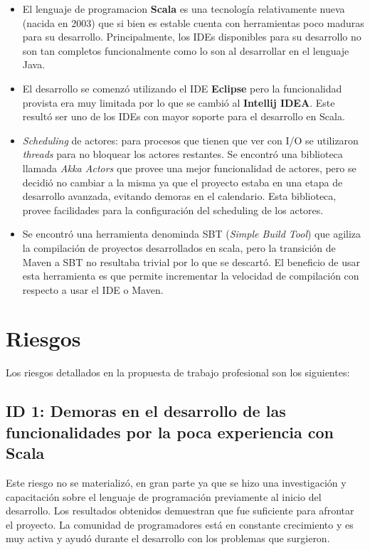 \documentclass[12pt,a4paper]{article}
\begin{document}
\begin{itemize}
	\item El lenguaje de programacion \textbf{Scala} es una tecnología relativamente nueva (nacida en 2003) que
	si bien es estable cuenta con herramientas poco maduras para su desarrollo. Principalmente, los IDEs disponibles
	para su desarrollo no son tan completos funcionalmente como lo son al desarrollar en el lenguaje Java.

	\item El desarrollo se comenzó utilizando el IDE \textbf{Eclipse} pero la funcionalidad provista era muy
	limitada por lo que se cambió al \textbf{Intellij IDEA}. Este resultó ser uno de los IDEs con mayor soporte
	para el desarrollo en Scala.

	\item \textit{Scheduling} de actores: para procesos que tienen que ver con I/O se utilizaron \textit{threads}
	para no bloquear los actores restantes. Se encontró una biblioteca llamada \textit{Akka Actors} que 
	provee una mejor funcionalidad de actores, pero se decidió no cambiar a la misma ya que el proyecto estaba
	en una etapa de desarrollo avanzada, evitando demoras en el calendario. Esta biblioteca, provee facilidades
	para la configuración del scheduling de los actores.

    \item Se encontró una herramienta denominda SBT (\textit{Simple Build Tool}) que agiliza la compilación
    de proyectos desarrollados en scala, pero la transición de Maven a SBT no resultaba trivial por lo que
    se descartó. El beneficio de usar esta herramienta es que permite incrementar la velocidad de compilación
    con respecto a usar el IDE o Maven.
    
\end{itemize}

\section{Riesgos}

Los riesgos detallados en la propuesta de trabajo profesional son los siguientes:

\subsection{ID 1: Demoras en el desarrollo de las funcionalidades por la poca experiencia con Scala}
Este riesgo no se materializó, en gran parte ya que se hizo una investigación y capacitación sobre el lenguaje de
programación previamente al inicio del desarrollo. Los resultados obtenidos demuestran que fue suficiente
para afrontar el proyecto. La comunidad de programadores está en constante crecimiento y es muy activa y ayudó
durante el desarrollo con los problemas que surgieron.
\end{document}
